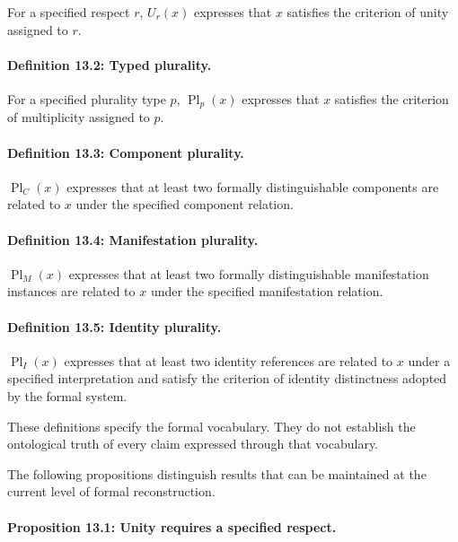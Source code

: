 For a specified respect \(r\),
\(U_r(x)\) expresses that \(x\)
satisfies the criterion of unity
assigned to \(r\).

\paragraph{Definition 13.2: Typed plurality.}

For a specified plurality type
\(p\), \(\operatorname{Pl}_p(x)\)
expresses that \(x\) satisfies
the criterion of multiplicity
assigned to \(p\).

\paragraph{Definition 13.3: Component plurality.}

\(\operatorname{Pl}_{C}(x)\)
expresses that at least two
formally distinguishable
components are related to \(x\)
under the specified component
relation.

\paragraph{Definition 13.4: Manifestation plurality.}

\(\operatorname{Pl}_{M}(x)\)
expresses that at least two
formally distinguishable
manifestation instances are
related to \(x\) under the
specified manifestation relation.

\paragraph{Definition 13.5: Identity plurality.}

\(\operatorname{Pl}_{I}(x)\)
expresses that at least two
identity references are related
to \(x\) under a specified
interpretation and satisfy
the criterion of identity
distinctness adopted by the
formal system.

These definitions specify the
formal vocabulary. They do not
establish the ontological truth
of every claim expressed through
that vocabulary.

The following propositions
distinguish results that can
be maintained at the current
level of formal reconstruction.

\paragraph{Proposition 13.1: Unity requires a specified respect.}

